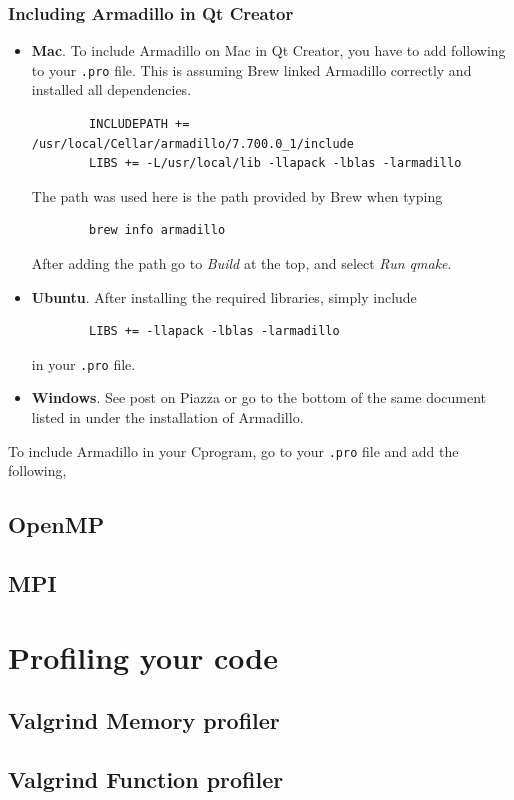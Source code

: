 \documentclass[11pt]{article}
\newcommand{\CC}{C\nolinebreak\hspace{-.05em}\raisebox{.4ex}{\tiny\bf +}\nolinebreak\hspace{-.10em}\raisebox{.4ex}{\tiny\bf +}}
\def\CC{{C\nolinebreak[4]\hspace{-.05em}\raisebox{.4ex}{\tiny\bf ++}}}
\begin{document}
\subsubsection{Including Armadillo in Qt Creator}
\begin{itemize}
    \item \textbf{Mac}. To include Armadillo on Mac in Qt Creator, you have to add following to your \texttt{.pro} file. This is assuming Brew linked Armadillo correctly and installed all dependencies.
    \begin{lstlisting}
        INCLUDEPATH += /usr/local/Cellar/armadillo/7.700.0_1/include
        LIBS += -L/usr/local/lib -llapack -lblas -larmadillo
    \end{lstlisting}
    The path was used here is the path provided by Brew when typing 
    \begin{lstlisting}
        brew info armadillo
    \end{lstlisting}
    After adding the path go to \textit{Build} at the top, and select \textit{Run qmake}.
    \item \textbf{Ubuntu}. After installing the required libraries, simply include
    \begin{lstlisting}
        LIBS += -llapack -lblas -larmadillo
    \end{lstlisting}
    in your \texttt{.pro} file.
    \item \textbf{Windows}. See post on Piazza or go to the bottom of the same document listed in under the installation of Armadillo.
\end{itemize}
To include Armadillo in your \CC program, go to your \texttt{.pro} file and add the following,

\subsection{OpenMP}

\subsection{MPI}

\section{Profiling your code}

\subsection{Valgrind Memory profiler}

\subsection{Valgrind Function profiler}
\end{document}
